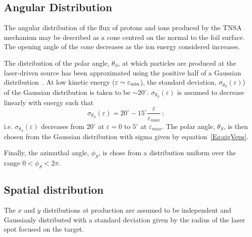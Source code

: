 \subsection{Angular Distribution}

The angular distribution of the flux of protons and ions produced by
the TNSA mechanism may be described as a cone centred on the normal to
the foil surface.
The opening angle of the cone decreases as the ion energy considered
increases.

The distribution of the polar angle, $\theta_S$, at which particles
are produced at the laser-driven source has been approximated using
the positive half of a Gaussian
distribution~\cite{10.1038/s41598-019-41705-0}.
At low kinetic energy ($\varepsilon \sim \varepsilon_{\rm min}$), the
standard deviation, $\sigma_{\theta_S}(\varepsilon)$) of the Gaussian
distribution is taken to be $\sim 20^\circ$.
$\sigma_{\theta_S}(\varepsilon)$ is assumed to decrease linearly with
energy such that
\begin{equation}
  \sigma_{\theta_S}(\varepsilon) =
                20^\circ - 15^\circ \frac{\varepsilon}{\varepsilon_{max}} \, ;
  \label{Eq:sigVeps}
\end{equation}
i.e. $\sigma_{\theta_S}(\varepsilon)$ decreases from $20^\circ$ at
$\varepsilon=0$ to $5^\circ$ at $\varepsilon_{max}$.
The polar angle, $\theta_S$, is then chosen from the Gaussian
distribution with sigma given by equation~\ref{Eq:sigVeps}.

Finally, the azimuthal angle, $\phi_S$, is chose from a distribution
uniform over the range $0 < \phi_S < 2\pi$.

\subsection{Spatial distribution}

The $x$ and $y$ distributions at production are assumed to be
independent and Gaussianly distributed with a standard deviation given
by the radius of the laser spot focused on the target.

